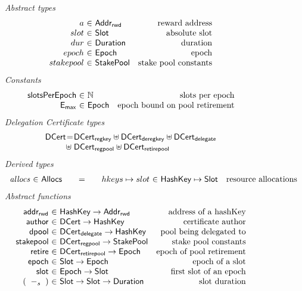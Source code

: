 \begin{figure}
  \emph{Abstract types}
  \begin{equation*}
    \begin{array}{r@{~\in~}lr}
      a & \AddrRWD & \text{reward address} \\
      slot & \Slot & \text{absolute slot}\\
      dur & \Duration & \text{duration}\\
      epoch & \Epoch & \text{epoch} \\
      stakepool & \StakePool & \text{stake pool constants}
    \end{array}
  \end{equation*}
  \emph{Constants}
  \begin{equation*}
    \begin{array}{r@{~\in~}lr}
      \slotsPer & \mathbb{N} & \text{slots per epoch} \\
      \emax & \Epoch & \text{epoch bound on pool retirement} \\
    \end{array}
  \end{equation*}
  \emph{Delegation Certificate types}
  \begin{equation*}
  \begin{array}{r@{}c@{}l}
    \DCert &=& \DCertRegKey \uniondistinct \DCertDeRegKey \uniondistinct \DCertDeleg \\
                &\hfill\uniondistinct\;& \DCertRegPool \uniondistinct \DCertRetirePool
  \end{array}
  \end{equation*}
  \emph{Derived types}
  \begin{equation*}
    \begin{array}{r@{~\in~}l@{\qquad=\qquad}r@{~\in~}lr}
      \var{allocs}
      & \Allocs
      & hkeys \mapsto slot
      & \HashKey \mapsto \Slot
      & \text{resource allocations}
    \end{array}
  \end{equation*}
  \emph{Abstract functions}
  \begin{equation*}
  \begin{array}{r@{~\in~}lr}
  \fun{addr_{rwd}} & \HashKey \to \AddrRWD
  & \text{address of a hashKey}
  \\
  \fun{author} & \DCert \to \HashKey
  & \text{certificate author}
  \\
  \fun{dpool} & \DCertDeleg \to \HashKey
  & \text{pool being delegated to}
  \\
  \fun{stakepool} & \DCertRegPool \to \StakePool
  & \text{stake pool constants}
  \\
  \fun{retire} & \DCertRetirePool \to \Epoch
  & \text{epoch of pool retirement}
  \\
  \fun{epoch} & \Slot \to \Epoch
  & \text{epoch of a slot}
  \\
  \fun{slot} & \Epoch \to \Slot
  & \text{first slot of an epoch}
  \\
    (\slotminus{}{}) & \Slot \to \Slot \to \Duration
  & \text{slot duration}
  \end{array}
  \end{equation*}


\end{figure}
